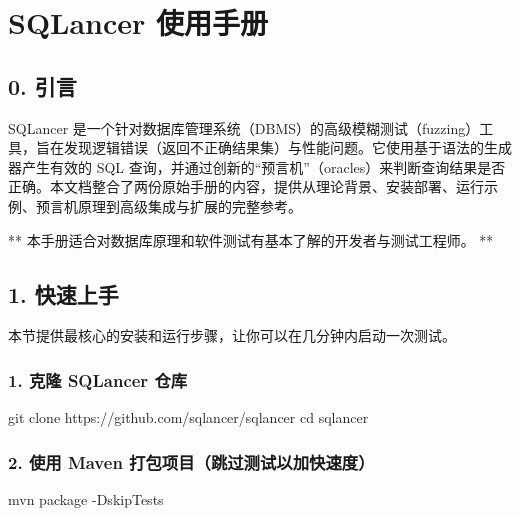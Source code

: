 \documentclass[
]{article}
\author{}
\date{}
\newenvironment{Shaded}{}{}
\newcommand{\AttributeTok}[1]{\textcolor[rgb]{0.49,0.56,0.16}{#1}}
\newcommand{\BuiltInTok}[1]{\textcolor[rgb]{0.00,0.50,0.00}{#1}}
\newcommand{\ExtensionTok}[1]{#1}
\newcommand{\FunctionTok}[1]{\textcolor[rgb]{0.02,0.16,0.49}{#1}}
\newcommand{\NormalTok}[1]{#1}
\begin{document}
\section{SQLancer 使用手册}\label{sqlancer-ux4f7fux7528ux624bux518c}

\subsection{0. 引言}\label{ux5f15ux8a00}

SQLancer
是一个针对数据库管理系统（DBMS）的高级模糊测试（fuzzing）工具，旨在发现逻辑错误（返回不正确结果集）与性能问题。它使用基于语法的生成器产生有效的
SQL
查询，并通过创新的``预言机''（oracles）来判断查询结果是否正确。本文档整合了两份原始手册的内容，提供从理论背景、安装部署、运行示例、预言机原理到高级集成与扩展的完整参考。

** 本手册适合对数据库原理和软件测试有基本了解的开发者与测试工程师。 **

\subsection{1. 快速上手}\label{ux5febux901fux4e0aux624b}

本节提供最核心的安装和运行步骤，让你可以在几分钟内启动一次测试。

\subsubsection{1. 克隆 SQLancer
仓库}\label{ux514bux9686-sqlancer-ux4ed3ux5e93}

\begin{Shaded}
\begin{Highlighting}[]
\FunctionTok{git}\NormalTok{ clone https://github.com/sqlancer/sqlancer}
\BuiltInTok{cd}\NormalTok{ sqlancer}
\end{Highlighting}
\end{Shaded}

\subsubsection{2. 使用 Maven
打包项目（跳过测试以加快速度）}\label{ux4f7fux7528-maven-ux6253ux5305ux9879ux76eeux8df3ux8fc7ux6d4bux8bd5ux4ee5ux52a0ux5febux901fux5ea6}

\begin{Shaded}
\begin{Highlighting}[]
\ExtensionTok{mvn}\NormalTok{ package }\AttributeTok{{-}DskipTests}
\end{Highlighting}
\end{Shaded}
\end{document}
